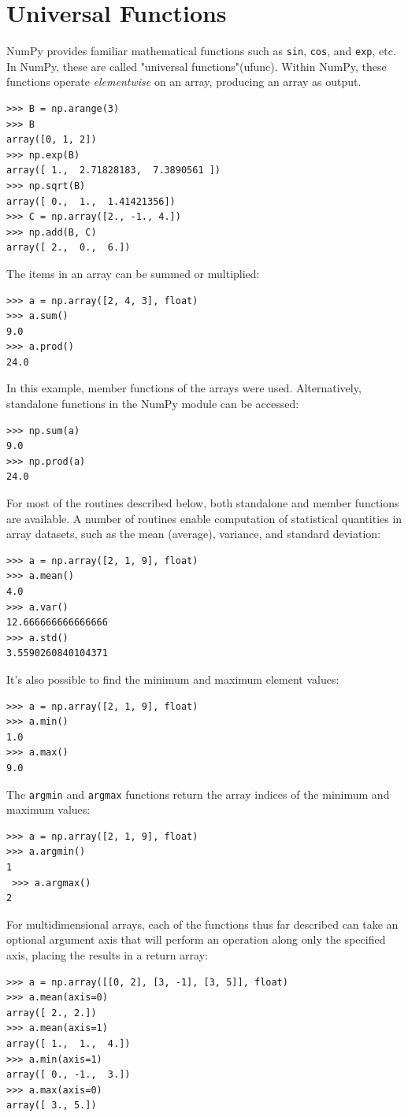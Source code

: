 \documentclass[12pt]{article}
\begin{document}
\section{Universal Functions}
NumPy provides familiar mathematical functions such as \texttt{sin}, \texttt{cos}, and \texttt{exp}, etc. In NumPy, these are called "universal functions"(ufunc). Within NumPy, these functions operate \textit{elementwise} on an array, producing an array as output.
\footnotesize
\begin{Verbatim}[frame=single]
>>> B = np.arange(3)
>>> B
array([0, 1, 2])
>>> np.exp(B)
array([ 1.,  2.71828183,  7.3890561 ])
>>> np.sqrt(B)
array([ 0.,  1.,  1.41421356])
>>> C = np.array([2., -1., 4.])
>>> np.add(B, C)
array([ 2.,  0.,  6.])
\end{Verbatim}
\normalsize
The items in an array can be summed or multiplied: 
\footnotesize
\begin{Verbatim}[frame=single]
>>> a = np.array([2, 4, 3], float) 
>>> a.sum() 
9.0 
>>> a.prod() 
24.0 
\end{Verbatim}
\normalsize
In this example, member functions of the arrays were used. Alternatively, standalone functions 
in the NumPy module can be accessed: 
\footnotesize
\begin{Verbatim}[frame=single]
>>> np.sum(a) 
9.0 
>>> np.prod(a) 
24.0 
\end{Verbatim}
\normalsize
For most of the routines described below, both standalone and member functions are available. 
A number of routines enable computation of statistical quantities in array datasets, such as the 
mean (average), variance, and standard deviation: 
\footnotesize
\begin{Verbatim}[frame=single]
>>> a = np.array([2, 1, 9], float) 
>>> a.mean() 
4.0 
>>> a.var() 
12.666666666666666 
>>> a.std() 
3.5590260840104371
\end{Verbatim}
\normalsize
It's also possible to find the minimum and maximum element values: 
\footnotesize
\begin{Verbatim}[frame=single]
>>> a = np.array([2, 1, 9], float) 
>>> a.min() 
1.0 
>>> a.max() 
9.0 
\end{Verbatim}
\normalsize
The \texttt{argmin} and \texttt{argmax} functions return the array indices of the minimum and maximum 
values: 
\footnotesize
\begin{Verbatim}[frame=single]
>>> a = np.array([2, 1, 9], float) 
>>> a.argmin()
1
￼>>> a.argmax()
2
\end{Verbatim}
\normalsize
For multidimensional arrays, each of the functions thus far described can take an optional argument axis that will perform an operation along only the specified axis, placing the results in a return array:
\footnotesize
\begin{Verbatim}[frame=single]
>>> a = np.array([[0, 2], [3, -1], [3, 5]], float) 
>>> a.mean(axis=0)
array([ 2., 2.])
>>> a.mean(axis=1)
array([ 1.,  1.,  4.])
>>> a.min(axis=1)
array([ 0., -1.,  3.])
>>> a.max(axis=0)
array([ 3., 5.]) 
\end{Verbatim}
\normalsize
\end{document}
